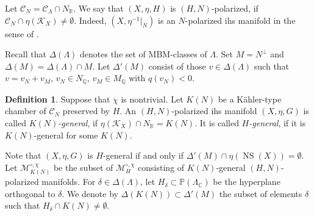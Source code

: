 \documentclass{amsart}
\theoremstyle{definition}
\newtheorem{definition}{Definition}[section]
\theoremstyle{plain}
\DeclareMathOperator{\NS}{NS}
\newcommand{\QQ}{\mathbb{Q}}
\newcommand{\RR}{\mathbb{R}}
\newcommand{\CC}{\mathbb{C}}
\newcommand{\PP}{\mathbb{P}}
\newcommand{\C}{\mathcal{C}}
\begin{document}
Let $\C_N = \C_\Lambda \cap N_\RR$.
We say that $(X,\eta,H)$ is $(H,N)$-polarized,
if $\C_N \cap \eta(\mathcal{K}_X) \neq \emptyset$.
Indeed, $(X,\eta^{-1}|_N)$ is an $N$-polarized ihs manifold
in the sense of \cite{camere:lattice-polarized-ihs}.

Recall that $\Delta(\Lambda)$ denotes the set of MBM-classes of $\Lambda$.
Set $M = N^\perp$ and $\Delta(M)=\Delta(\Lambda) \cap M$.
Let $\Delta'(M)$ consist of those $v \in \Delta(\Lambda)$ such that
$v = v_N + v_M$, $v_N \in N_\QQ$, $v_M \in M_\QQ$ with
$q(v_N)<0$.

 \begin{definition}
 Suppose that $\chi$ is nontrivial.
 Let $K(N)$ be a K\"ahler-type chamber of $\C_N$ preserved by
 $H$. An $(H,N)$-polarized ihs manifold $(X,\eta,G)$ is called
 \emph{$K(N)$-general}, if $\eta(\mathcal{K}_X) \cap N_\RR = K(N)$.
 It is called \emph{$H$-general}, if it is $K(N)$-general for
 some $K(N)$.
 \end{definition}
Note that $(X,\eta,G)$ is $H$-general if and only if
$\Delta'(M) \cap \eta(\NS(X))=\emptyset$.
 Let $\mathcal{M}^{\circ,\chi}_{K(N)}$ be the subset of
 $\mathcal{M}_H^{\circ,\chi}$ consisting of $K(N)$-general
 $(H,N)$-polarized manifolds. For $\delta \in \Delta(\Lambda)$,
 let $H_\delta \subset \PP(\Lambda_\CC)$ be the hyperplane
 orthogonal to $\delta$.
 We denote by $\Delta(K(N)) \subset \Delta'(M)$ the subset of elements $\delta$ such that $H_\delta \cap K(N) \neq \emptyset$.
\end{document}
